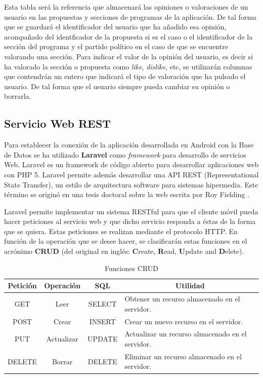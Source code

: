 Esta tabla será la referencia que almacenará las opiniones o valoraciones de un usuario en las propuestas y secciones de programas de la aplicación. De tal forma que se guardará el identificador del usuario que ha añadido esa opinión, acompañado del identficador de la propuesta si es el caso o el identificador de la sección del programa y el partido político en el caso de que se encuentre valorando una sección. Para indicar el valor de la opinión del usuario, es decir si ha valorado la sección o propuesta como \textit{like}, \textit{dislike}, etc, se utilizarán columnas que contendrán un entero que indicará el tipo de valoración que ha pulsado el usuario. De tal forma que el usuario siempre pueda cambiar su opinión o borrarla.

\subsection{Servicio Web REST} \label{ssec:seviceREST}

Para establecer la conexión de la aplicación desarrollada en Android con la Base de Datos se ha utilizado \textbf{Laravel} como \textit{framework} para desarrollo de servicios Web. Laravel \cite{ref:laravel} es un framework de código abierto para desarrollar aplicaciones web con PHP 5. Laravel permite además desarrollar una API REST (Representational State Transfer), un estilo de arquitectura software para sistemas hipermedia. Este término se originó en una tesis doctoral sobre la web escrita por Roy Fielding \cite{ref:RESTPhd}.

Laravel permite implementar un sistema RESTful para que el cliente móvil pueda hacer peticiones al servicio web y que dicho servicio responda a éstas de la forma que se quiera. Estas peticiones se realizan mediante el protocolo HTTP. En función de la operación que se desee hacer, se clasificarán estas funciones en el acrónimo \textbf{CRUD} \cite{ref:CRUD} (del original en inglés: \textbf{C}reate, \textbf{R}ead, \textbf{U}pdate and \textbf{D}elete).

\begin{table}[!]
\begin{tabular}{|c|c|c|m{6.25cm}|}
\hline
{\bf Petición} & {\bf Operación} & {\bf SQL} & \multicolumn{1}{c|}{{\bf Utilidad}}              \\ \hline
GET            & Leer            & SELECT    & Obtener un recurso almacenado en el servidor.    \\ \hline
POST           & Crear           & INSERT    & Crear un nuevo recurso en el servidor.           \\ \hline
PUT            & Actualizar      & UPDATE    & Actualizar un recurso almacenado en el servidor. \\ \hline
DELETE         & Borrar          & DELETE    & Eliminar un recurso almacenado en el servidor.   \\ \hline
\end{tabular}
\caption{Funciones CRUD}
\label{fig:CRUDtable}
\end{table}

